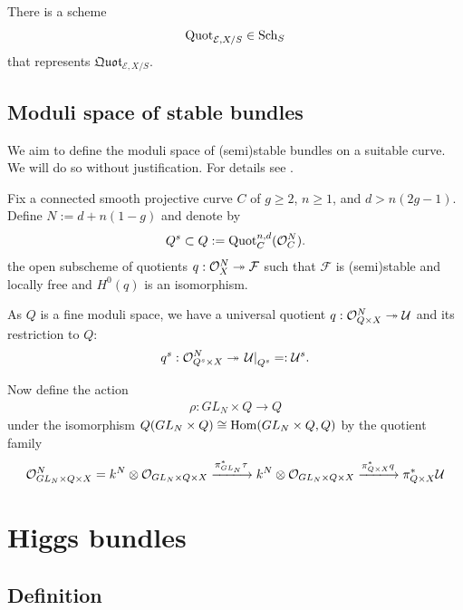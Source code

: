 \documentclass{article}
\begin{document}
\begin{theorem}
  There is a scheme
  \begin{align*}
    \text{Quot}_{\mathcal E,X/S} \in \operatorname{Sch}_S
  \end{align*}
  that represents $\mathfrak{Quot}_{\mathcal E,X/S}$.
\end{theorem}

\subsection{Moduli space of stable bundles}

We aim to define the moduli space of (semi)stable bundles on a
suitable curve. We will do so without justification. For details
see \cite[section 8.8]{hoskins}.

Fix a connected smooth projective curve $C$ of $g\geq 2$,
$n\geq 1$, and $d > n(2g - 1)$. Define
$N:=d+n(1-g)$ and denote by
\begin{align*}
  Q^s \subset Q := \operatorname{Quot}_C^{n,d}(\mathcal O_C^N).
\end{align*}
the open subscheme of quotients $q:\mathcal O^N_X\twoheadrightarrow\mathcal F$
such that $\mathcal F$ is (semi)stable and locally free and
$H^0(q)$ is an isomorphism.

As $Q$ is a fine moduli space, we have a universal quotient
$q:\mathcal O_{Q\times X}^N\twoheadrightarrow \mathcal U$
and its restriction to $Q$:
\begin{align*}
  q^s : \mathcal O_{Q^s\times X}^N\twoheadrightarrow \left.{\mathcal U}\right\vert_{Q^s} =: \mathcal U^s.
\end{align*}

Now define the action
\begin{align*}
  \rho : GL_N \times Q \to Q
\end{align*}
under the isomorphism $Q(GL_N\times Q) \cong \operatorname{Hom}(GL_N\times Q,Q)$
by the quotient family
\begin{align*}
  \mathcal O^N_{GL_N\times Q\times X}
  = k^N \otimes \mathcal O_{GL_N\times Q\times X}
  \xlongrightarrow{\pi^*_{GL_N}\tau}
  k^N \otimes \mathcal O_{GL_N\times Q\times X}
  \xlongrightarrow{\pi^*_{Q\times X} q}
  \pi^*_{Q\times X}\mathcal U
\end{align*}

\section{Higgs bundles}

\subsection{Definition}
\end{document}
